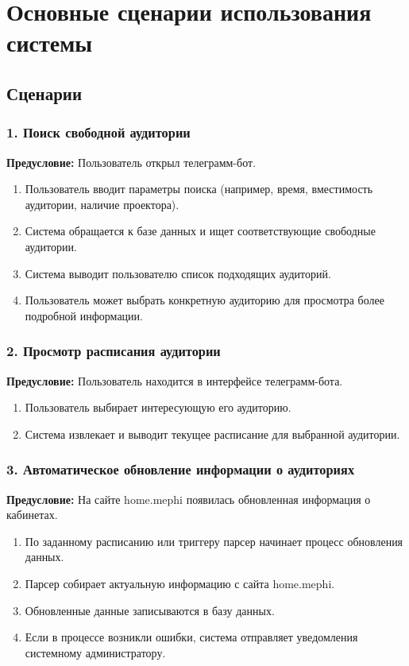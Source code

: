 \chapter{Основные сценарии использования системы}

\section*{Сценарии}

\subsection*{1. Поиск свободной аудитории}
\textbf{Предусловие:} Пользователь открыл телеграмм-бот.

\begin{enumerate}
    \item Пользователь вводит параметры поиска (например, время, вместимость
аудитории, наличие проектора).
    \item Система обращается к базе данных и ищет соответствующие свободные
аудитории.
    \item Система выводит пользователю список подходящих аудиторий.
    \item Пользователь может выбрать конкретную аудиторию для просмотра более
подробной информации.
\end{enumerate}

\subsection*{2. Просмотр расписания аудитории}
\textbf{Предусловие:} Пользователь находится в интерфейсе телеграмм-бота.

\begin{enumerate}
    \item Пользователь выбирает интересующую его аудиторию.
    \item Система извлекает и выводит текущее расписание для выбранной
аудитории.
\end{enumerate}

\subsection*{3. Автоматическое обновление информации о аудиториях}
\textbf{Предусловие:} На сайте home.mephi появилась обновленная информация о
кабинетах.

\begin{enumerate}
    \item По заданному расписанию или триггеру парсер начинает процесс
обновления данных.
    \item Парсер собирает актуальную информацию с сайта home.mephi.
    \item Обновленные данные записываются в базу данных.
    \item Если в процессе возникли ошибки, система отправляет уведомления
системному администратору.
\end{enumerate}

